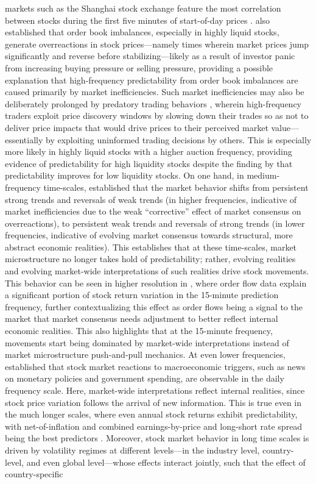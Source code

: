 \documentclass[stu,floatsintext]{apa7}
\begin{document}
markets such as the Shanghai stock exchange feature the most correlation between stocks during the first five minutes of start-of-day prices \parencite{tan2016exploring}. \textcite{sirnes2021tick} also established that order book imbalances, especially in highly liquid stocks, generate overreactions in stock prices—namely times wherein market prices jump significantly and reverse before stabilizing—likely as a result of investor panic from increasing buying pressure or selling pressure, providing a possible explanation that high-frequency predictability from order book imbalances are caused primarily by market inefficiencies. Such market inefficiencies may also be deliberately prolonged by predatory trading behaviors \parencite{du2017what}, wherein high-frequency traders exploit price discovery windows by slowing down their trades so as not to deliver price impacts that would drive prices to their perceived market value—essentially by exploiting uninformed trading decisions by others. This is especially more likely in highly liquid stocks with a higher auction frequency, providing evidence of predictability for high liquidity stocks despite the finding by \textcite{aitsahalia2022high} that predictability improves for low liquidity stocks. On one hand, in medium-frequency time-scales, \textcite{safari2025trends} established that the market behavior shifts from persistent strong trends and reversals of weak trends (in higher frequencies, indicative of market inefficiencies due to the weak “corrective” effect of market consensus on overreactions), to persistent weak trends and reversals of strong trends (in lower frequencies, indicative of evolving market consensus towards structural, more abstract economic realities). This establishes that at these time-scales, market microstructure no longer takes hold of predictability; rather, evolving realities and evolving market-wide interpretations of such realities drive stock movements. This behavior can be seen in higher resolution in \textcite{moberg2007stock}, where order flow data explain a significant portion of stock return variation in the 15-minute prediction frequency, further contextualizing this effect as order flows being a signal to the market that market consensus needs adjustment to better reflect internal economic realities. This also highlights that at the 15-minute frequency, movements start being dominated by market-wide interpretations instead of market microstructure push-and-pull mechanics. At even lower frequencies, \textcite{baker2025what} established that stock market reactions to macroeconomic triggers, such as news on monetary policies and government spending, are observable in the daily frequency scale. Here, market-wide interpretations reflect internal realities, since stock price variation follows the arrival of new information. This is true even in the much longer scales, where even annual stock returns exhibit predictability, with net-of-inflation and combined earnings-by-price and long-short rate spread being the best predictors \parencite{kyriakou2019forecasting}. Moreover, stock market behavior in long time scales is driven by volatility regimes at different levels—in the industry level, country-level, and even global level—whose effects interact jointly, such that the effect of country-specific 
\end{document}
